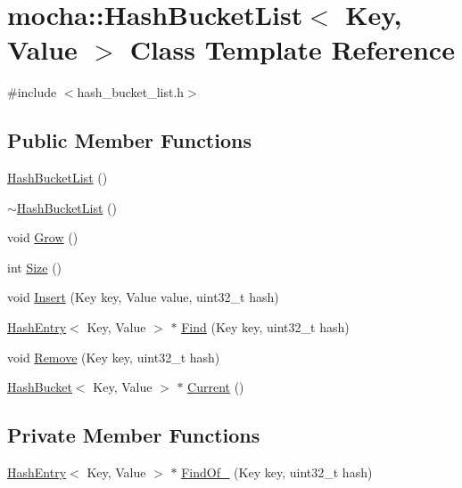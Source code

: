 \hypertarget{classmocha_1_1_hash_bucket_list}{
\section{mocha::HashBucketList$<$ Key, Value $>$ Class Template Reference}
\label{classmocha_1_1_hash_bucket_list}
}


{\ttfamily \#include $<$hash\_\-bucket\_\-list.h$>$}

\subsection*{Public Member Functions}
\begin{DoxyCompactItemize}
\item 
\hyperlink{classmocha_1_1_hash_bucket_list_abc8e6ddfb8e02080cf6a8a409c268669}{HashBucketList} ()
\item 
\hyperlink{classmocha_1_1_hash_bucket_list_ab94d5fb7d93bdb478a56e22896427983}{$\sim$HashBucketList} ()
\item 
void \hyperlink{classmocha_1_1_hash_bucket_list_ab59d1be3b68842e1e67524a4e74fb694}{Grow} ()
\item 
int \hyperlink{classmocha_1_1_hash_bucket_list_ad5a39889a6d158bb019197ace3589079}{Size} ()
\item 
void \hyperlink{classmocha_1_1_hash_bucket_list_a316eeea840d4a495a7eea5db001c6757}{Insert} (Key key, Value value, uint32\_\-t hash)
\item 
\hyperlink{classmocha_1_1_hash_entry}{HashEntry}$<$ Key, Value $>$ $\ast$ \hyperlink{classmocha_1_1_hash_bucket_list_a96aff031b2741e3f944ef5b45b6573d0}{Find} (Key key, uint32\_\-t hash)
\item 
void \hyperlink{classmocha_1_1_hash_bucket_list_a4070d3ab40971ec15b7d531f83eedb1a}{Remove} (Key key, uint32\_\-t hash)
\item 
\hyperlink{classmocha_1_1_hash_bucket}{HashBucket}$<$ Key, Value $>$ $\ast$ \hyperlink{classmocha_1_1_hash_bucket_list_a5ba0821404be7eb16b38a1caa7cc1f63}{Current} ()
\end{DoxyCompactItemize}
\subsection*{Private Member Functions}
\begin{DoxyCompactItemize}
\item 
\hyperlink{classmocha_1_1_hash_entry}{HashEntry}$<$ Key, Value $>$ $\ast$ \hyperlink{classmocha_1_1_hash_bucket_list_ae1217a71285826d3801019b7a4a380a1}{FindOf\_\-} (Key key, uint32\_\-t hash)
\end{DoxyCompactItemize}
